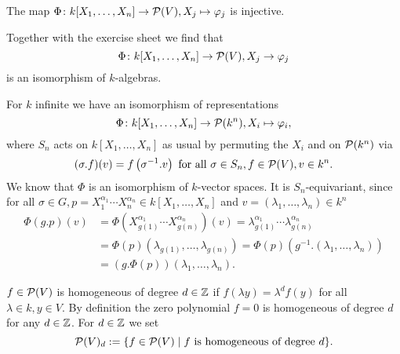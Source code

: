 \begin{cor}
 The map $\Phi \colon k[X_1, \dotsc, X_n] \to \mathcal{P}(V), X_j \mapsto \varphi_j$ is injective.
\end{cor}


Together with the exercise sheet we find that
\[
 \Phi \colon k[X_1, \dotsc, X_n] \to \mathcal{P}(V), X_j \to \varphi_j
\]
is an isomorphism of $k$-algebras.


\begin{rem}
 For $k$ infinite we have an isomorphism of representations
 \[
  \Phi \colon k[X_1, \dotsc, X_n] \to \mathcal{P}(k^n), X_i \mapsto \varphi_i,
 \]
 where $S_n$ acts on $k[X_1, \dotsc, X_n]$ as usual by permuting the $X_i$ and on $\mathcal{P}(k^n)$ via
 \[
  (\sigma.f)(v) = f\left( \sigma^{-1}.v \right) \text{ for all } \sigma \in S_n, f \in \mathcal{P}(V), v \in k^n.
 \]
 We know that $\Phi$ is an isomorphism of $k$-vector spaces. It is $S_n$-equivariant, since for all $\sigma \in G, p = X_1^{\alpha_1} \dotsm X_n^{\alpha_n} \in k[X_1, \dotsc, X_n]$ and $v = (\lambda_1, \dotsc, \lambda_n) \in k^n$
 \begin{align*}
  \Phi(g.p)(v)
  &= \Phi\left( X_{g(1)}^{\alpha_1} \dotsm X_{g(n)}^{\alpha_n} \right)(v)
  = \lambda_{g(1)}^{\alpha_1} \dotsm \lambda_{g(n)}^{\alpha_n} \\
  &= \Phi(p)( \lambda_{g(1)}, \dotsc, \lambda_{g(n)} )
  = \Phi(p)\left( g^{-1}.(\lambda_1, \dotsc, \lambda_n) \right) \\
  &= (g.\Phi(p))(\lambda_1, \dotsc, \lambda_n).
 \end{align*}
\end{rem}


\begin{defi}
 $f \in \mathcal{P}(V)$ is homogeneous of degree $d \in \mathbb{Z}$ if $f(\lambda y) = \lambda^d f(y)$ for all $\lambda \in k, y \in V$. By definition the zero polynomial $f=0$ is homogeneous of degree $d$ for any $d \in \mathbb{Z}$. For $d \in \mathbb{Z}$ we set
 \[
  \mathcal{P}(V)_d := \{f \in \mathcal{P}(V) \mid f \text{ is homogeneous of degree } d\}.
 \]
\end{defi}


